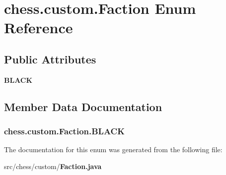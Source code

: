 \section{chess.\+custom.\+Faction Enum Reference}
\label{enumchess_1_1custom_1_1_faction}
\subsection*{Public Attributes}
\begin{DoxyCompactItemize}
\item 
{\bf B\+L\+A\+C\+K}
\end{DoxyCompactItemize}


\subsection{Member Data Documentation}
\subsubsection[{B\+L\+A\+C\+K}]{\setlength{\rightskip}{0pt plus 5cm}chess.\+custom.\+Faction.\+B\+L\+A\+C\+K}\label{enumchess_1_1custom_1_1_faction_ae494d05789ce12f1f8937300f14e093f}


The documentation for this enum was generated from the following file\+:\begin{DoxyCompactItemize}
\item 
src/chess/custom/{\bf Faction.\+java}\end{DoxyCompactItemize}
